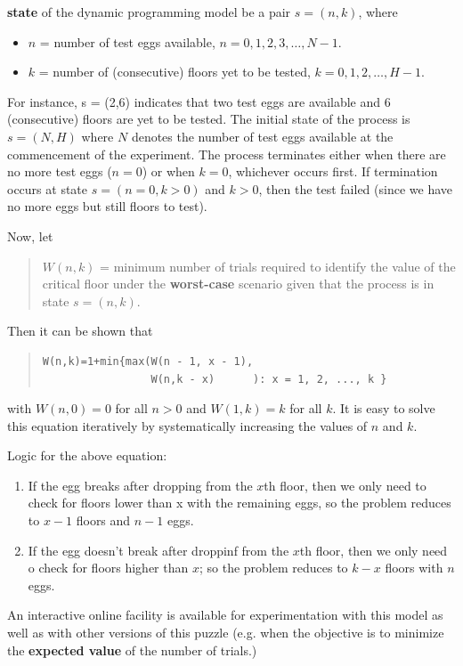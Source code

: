 \textbf{state} of the dynamic programming model be a pair $s=(n,k)$, where
\begin{itemize}%
\item $n$ = number of test eggs available, $n=0,1,2,3,\ldots,N-1$.
\item $k$ = number of (consecutive) floors yet to be tested,
  $k=0,1,2,\ldots,H-1$.
\end{itemize}
For instance, s = (2,6) indicates that two test eggs are available and 6
(consecutive) floors are yet to be tested. The initial state of the process
is $s=(N,H)$ where $N$ denotes the number of test eggs available at the
commencement of the experiment. The process terminates either when there are
no more test eggs ($n=0$) or when $k=0$, whichever occurs first. If
termination occurs at state $s=(n=0,k>0)$ and $k>0$, then the test failed
(since we have no more eggs but still floors to test).

Now, let
\begin{quotation}
$W(n,k)$ = minimum number of trials required to identify the value of the
critical floor under the \textbf{worst-case} scenario given that the process
is in state $s=(n,k)$.
\end{quotation}
Then it can be shown that
\begin{quotation}
\begin{lstlisting}[style=raygeneric]
W(n,k)=1+min{max(W(n - 1, x - 1),
                 W(n,k - x)      ): x = 1, 2, ..., k }
\end{lstlisting}
\end{quotation}
with $W(n,0)=0$ for all $n > 0$ and $W(1,k) = k$ for all $k$. It is easy to
solve this equation iteratively by systematically increasing the values of
$n$ and $k$.

Logic for the above equation:
\begin{enumerate}[label=\textbf{\arabic*.}]
\item If the egg breaks after dropping from the $x$th floor, then we only
  need to check for floors lower than x with the remaining eggs, so the
  problem reduces to $x-1$ floors and $n-1$ eggs.
\item If the egg doesn't break after droppinf from the $x$th floor, then we
  only need o check for floors higher than $x$; so the problem reduces to
  $k-x$ floors with $n$ eggs.
\end{enumerate}
An interactive online facility is available for experimentation with this
model as well as with other versions of this puzzle (e.g. when the objective
is to minimize the \textbf{expected value} of the number of trials.)

